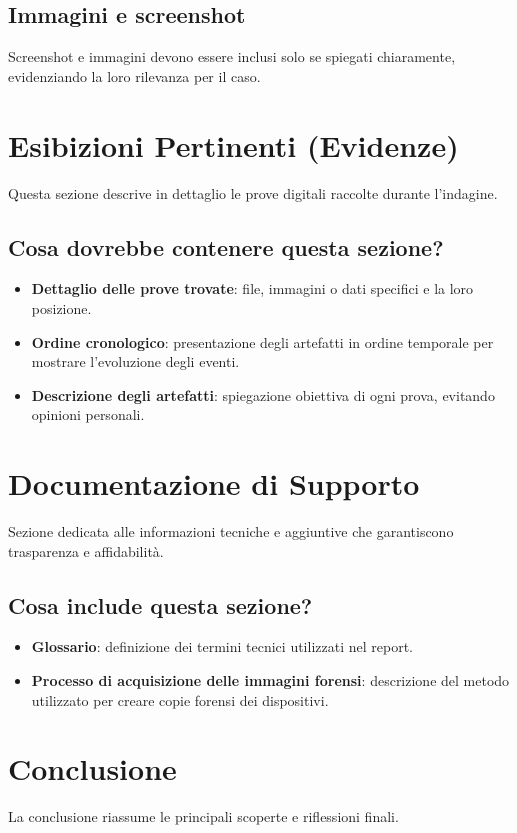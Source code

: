 \documentclass[a4paper,12pt]{report}
\begin{document}
\subsection{Immagini e screenshot}
Screenshot e immagini devono essere inclusi solo se spiegati chiaramente, evidenziando la loro rilevanza per il caso.

\section{Esibizioni Pertinenti (Evidenze)}
Questa sezione descrive in dettaglio le prove digitali raccolte durante l'indagine.

\subsection{Cosa dovrebbe contenere questa sezione?}
\begin{itemize}
    \item \textbf{Dettaglio delle prove trovate}: file, immagini o dati specifici e la loro posizione.
    \item \textbf{Ordine cronologico}: presentazione degli artefatti in ordine temporale per mostrare l'evoluzione degli eventi.
    \item \textbf{Descrizione degli artefatti}: spiegazione obiettiva di ogni prova, evitando opinioni personali.
\end{itemize}

\section{Documentazione di Supporto}
Sezione dedicata alle informazioni tecniche e aggiuntive che garantiscono trasparenza e affidabilità.

\subsection{Cosa include questa sezione?}
\begin{itemize}
    \item \textbf{Glossario}: definizione dei termini tecnici utilizzati nel report.
    \item \textbf{Processo di acquisizione delle immagini forensi}: descrizione del metodo utilizzato per creare copie forensi dei dispositivi.
\end{itemize}

\section{Conclusione}
La conclusione riassume le principali scoperte e riflessioni finali.
\end{document}

